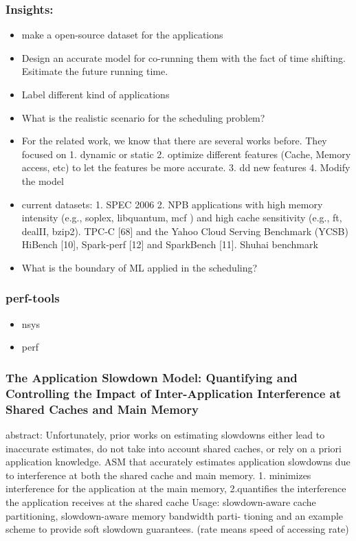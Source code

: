 \documentclass[UTF8]{article}
\begin{document}
    \subsubsection{Insights:}
    \begin{itemize}
        \item make a open-source dataset for the applications 
        \item Design an accurate model for co-running them with the fact of time shifting. Esitimate the future running time.
        \item Label different kind of applications
        \item What is the realistic scenario for the scheduling problem?
        \item For the related work, we know that there are several works before. They focused on 1. dynamic or static 2. optimize different features (Cache, Memory access, etc) to let the features be more accurate. 3. dd new features 4. Modify the model
        \item current datasets: 1. SPEC 2006 2. NPB applications with high memory intensity (e.g., soplex, libquantum, mcf ) and high cache sensitivity (e.g., ft, dealII, bzip2). TPC-C [68] and the Yahoo Cloud Serving Benchmark (YCSB) HiBench [10], Spark-perf [12] and SparkBench [11]. Shuhai benchmark
        \item What is the boundary of ML applied in the scheduling?
    \end{itemize}

    \subsubsection{perf-tools}
    \begin{itemize}
        \item nsys
        \item perf
    \end{itemize}

    \subsubsection{The Application Slowdown Model: Quantifying and Controlling the Impact of Inter-Application Interference at Shared Caches and Main Memory}
    
    abstract: Unfortunately, prior works on estimating slowdowns either lead to inaccurate estimates, do not take into account shared caches, or rely on a priori application knowledge. ASM that accurately estimates application slowdowns due to interference at both the shared cache and main memory.  1. minimizes interference for the application at the main memory, 2.quantifies the interference the application receives at the shared cache Usage: slowdown-aware cache partitioning, slowdown-aware memory bandwidth parti- tioning and an example scheme to provide soft slowdown guarantees. (rate means speed of accessing rate)
    
\end{document}
